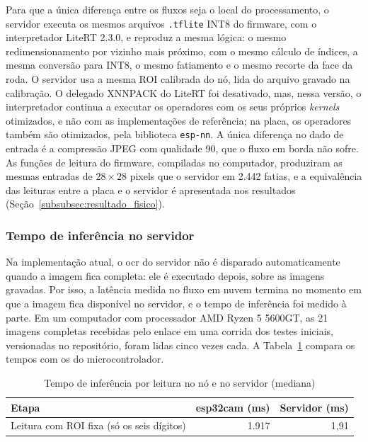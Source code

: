 Para que a única diferença entre os fluxos seja o local do processamento, o servidor
executa os mesmos arquivos \texttt{.tflite} INT8 do firmware, com o interpretador LiteRT
2.3.0, e reproduz a mesma lógica: o mesmo redimensionamento por vizinho mais próximo, com
o mesmo cálculo de índices, a mesma conversão para INT8, o
mesmo fatiamento e o mesmo recorte da face da roda. O servidor usa a
mesma ROI calibrada do nó, lida do arquivo gravado na calibração. O delegado XNNPACK do LiteRT foi
desativado, mas, nessa versão, o interpretador continua a executar os operadores com os
seus próprios \textit{kernels} otimizados, e não com as implementações de referência; na
placa, os operadores também são otimizados, pela biblioteca \texttt{esp-nn}. A
única diferença no dado de entrada é a compressão JPEG com qualidade 90, que o fluxo em
borda não sofre. As funções de leitura do firmware, compiladas no computador, produziram
as mesmas entradas de $28 \times 28$ pixels que o servidor em 2.442 fatias, e a
equivalência das leituras entre a placa e o servidor é apresentada nos resultados
(Seção~\ref{subsubsec:resultado_fisico}).

\subsubsection{Tempo de inferência no servidor}
\label{subsubsec:tempo_servidor}

Na implementação atual, o \gls{ocr} do servidor não é disparado automaticamente quando a
imagem fica completa: ele é executado depois, sobre as imagens gravadas. Por isso, a
latência medida no fluxo em nuvem termina no momento em que a imagem fica disponível no
servidor, e o tempo de inferência foi medido à parte. Em um computador com processador
AMD Ryzen 5 5600GT, as 21 imagens completas recebidas pelo enlace em uma corrida dos testes
iniciais, versionadas no repositório, foram lidas cinco vezes cada. A Tabela~\ref{tab:tempo_inferencia} compara os tempos com os do microcontrolador.

\begin{table}[H]
    \centering
    \caption{Tempo de inferência por leitura no nó e no servidor (mediana)}
    \label{tab:tempo_inferencia}
    \begin{tabular}{@{}lrr@{}}
        \toprule
        \textbf{Etapa} & \textbf{\gls{esp32cam} (ms)} & \textbf{Servidor (ms)} \\
        \midrule
        Leitura com ROI fixa (só os seis dígitos) & 1.917 & 1,91 \\
        \bottomrule
    \end{tabular}
\end{table}

